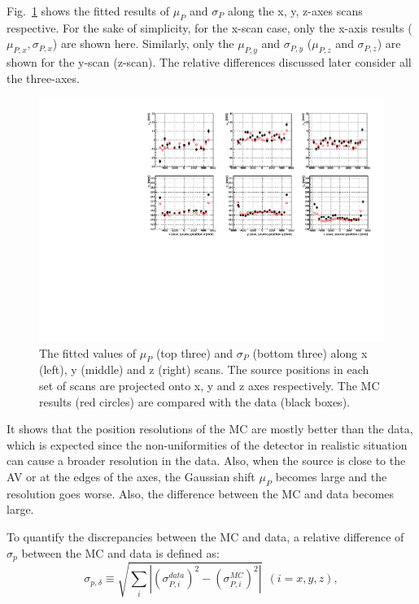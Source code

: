 Fig.~\ref{MPWscanXYZResols} shows the fitted results of $\mu_P$ and $\sigma_P$ along the x, y, z-axes scans respective. For the sake of simplicity, for the x-scan case, only the x-axis results ($\mu_{P,x},\sigma_{P,x}$) are shown here. Similarly, only the $\mu_{P,y}$ and $\sigma_{P,y}$ ($\mu_{P,z}$ and $\sigma_{P,z}$) are shown for the y-scan (z-scan). The relative differences discussed later consider all the three-axes.

\begin{figure}
	\centering
	\includegraphics[width=16cm]{N16_rat6176_muPandSigmaP_xyzScans.pdf}
	\caption{The fitted values of $\mu_P$ (top three) and $\sigma_P$ (bottom three) along x (left), y (middle) and z (right) scans. The source positions in each set of scans are projected onto x, y and z axes respectively. The MC results (red circles) are compared with the data (black boxes).}
	\label{MPWscanXYZResols}
\end{figure}

It shows that the position resolutions of the MC are mostly better than the data, which is expected since the non-uniformities of the detector in realistic situation can cause a broader resolution in the data\cite{waterunidoc}. Also, when the source is close to the AV or at the edges of the axes, the Gaussian shift $\mu_P$ becomes large and the resolution goes worse. Also, the difference between the MC and data becomes large.

To quantify the discrepancies between the MC and data, a relative difference of $\sigma_p$ between the MC and data is defined as\cite{waterunidoc}:
\begin{equation}
\sigma_{p,\delta}\equiv\sqrt{\sum_i|(\sigma^{data}_{P,i})^2-(\sigma^{MC}_{P,i})^2|}~~(i=x,y,z),
\end{equation}
 
